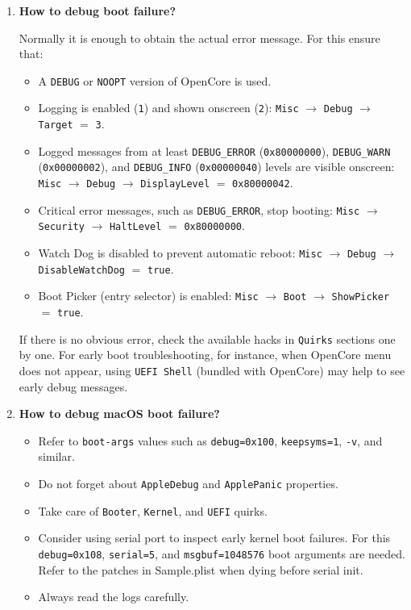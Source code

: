 \documentclass[]{article}
\providecommand{\tightlist}{%
  \setlength{\itemsep}{0pt}\setlength{\parskip}{0pt}}
\begin{document}
\begin{enumerate}
\item
  \textbf{How to debug boot failure?}

  Normally it is enough to obtain the actual error message. For this
  ensure that:
  \begin{itemize}
  \tightlist
  \item A \texttt{DEBUG} or \texttt{NOOPT} version of OpenCore is used.
  \item Logging is enabled (\texttt{1}) and shown onscreen (\texttt{2}):
  \texttt{Misc} $\rightarrow$ \texttt{Debug} $\rightarrow$ \texttt{Target}
  $=$ \texttt{3}.
  \item Logged messages from at least \texttt{DEBUG\_ERROR}
  (\texttt{0x80000000}), \texttt{DEBUG\_WARN} (\texttt{0x00000002}), and
  \texttt{DEBUG\_INFO} (\texttt{0x00000040}) levels are visible onscreen:
  \texttt{Misc} $\rightarrow$ \texttt{Debug} $\rightarrow$ \texttt{DisplayLevel}
  $=$ \texttt{0x80000042}.
  \item Critical error messages, such as \texttt{DEBUG\_ERROR}, stop booting:
  \texttt{Misc} $\rightarrow$ \texttt{Security}
  $\rightarrow$ \texttt{HaltLevel} $=$ \texttt{0x80000000}.
  \item Watch Dog is disabled to prevent automatic reboot:
  \texttt{Misc} $\rightarrow$ \texttt{Debug} $\rightarrow$
  \texttt{DisableWatchDog} $=$ \texttt{true}.
  \item Boot Picker (entry selector) is enabled: \texttt{Misc}
  $\rightarrow$ \texttt{Boot} $\rightarrow$ \texttt{ShowPicker} $=$ \texttt{true}.
  \end{itemize}

  If there is no obvious error, check the available hacks in \texttt{Quirks} sections
  one by one. For early boot troubleshooting, for instance, when OpenCore menu does not appear,
  using \texttt{UEFI Shell} (bundled with OpenCore) may help to see
  early debug messages.

\item
  \textbf{How to debug macOS boot failure?}

  \begin{itemize}
  \tightlist
  \item Refer to \texttt{boot-args} values such as \texttt{debug=0x100}, \texttt{keepsyms=1},
    \texttt{-v}, and similar.
  \item Do not forget about \texttt{AppleDebug} and \texttt{ApplePanic} properties.
  \item Take care of \texttt{Booter}, \texttt{Kernel}, and \texttt{UEFI} quirks.
  \item Consider using serial port to inspect early kernel boot failures. For this
    \texttt{debug=0x108}, \texttt{serial=5}, and \texttt{msgbuf=1048576} boot arguments are needed.
    Refer to the patches in Sample.plist when dying before serial init.
  \item Always read the logs carefully.
  \end{itemize}


\end{enumerate}
\end{document}

